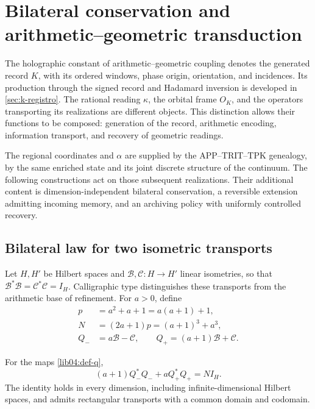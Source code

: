 \section{Bilateral conservation and arithmetic--geometric transduction}
\label{lib04:bilateral}

The holographic constant of arithmetic--geometric coupling denotes
the generated record \(K\), with its ordered windows, phase origin,
orientation, and incidences. Its production through the signed record and
Hadamard inversion is developed in \cref{sec:k-registro}.
The rational reading \(\kappa\), the orbital frame \(O_K\), and the
operators transporting its realizations are different objects.
This distinction allows their functions to be composed: generation of the record,
arithmetic encoding, information transport, and recovery of
geometric readings.

The regional coordinates and \(\alpha\) are supplied by the
APP--TRIT--TPK genealogy, by the same enriched state and its joint
discrete structure of the continuum. The following constructions act on those
subsequent realizations. Their additional content is dimension-independent
bilateral conservation, a reversible extension admitting
incoming memory, and an archiving policy with uniformly
controlled recovery.

\subsection{Bilateral law for two isometric transports}
\label{lib04:ley}

Let \(H,H'\) be Hilbert spaces and
\(\mathcal B,\mathcal C:H\to H'\) linear isometries, so that
\(\mathcal B^*\mathcal B=\mathcal C^*\mathcal C=I_H\).
Calligraphic type distinguishes these transports from the arithmetic
base of refinement. For \(a>0\), define
\begin{equation}
 \begin{aligned}
 p&=a^2+a+1=a(a+1)+1,\\
 N&=(2a+1)p=(a+1)^3+a^3,\\
 Q_-&=a\mathcal B-\mathcal C,\qquad
 Q_+=(a+1)\mathcal B+\mathcal C.
 \end{aligned}
 \label{lib04:def-q}
\end{equation}

\begin{theorem}
\label{lib04:teo-balance}
For the maps \eqref{lib04:def-q},
\begin{equation}
 (a+1)Q_-^*Q_-+aQ_+^*Q_+=NI_H.
 \label{lib04:balance}
\end{equation}
The identity holds in every dimension, including infinite-dimensional
Hilbert spaces, and admits rectangular transports with a common
domain and codomain.
\end{theorem}

